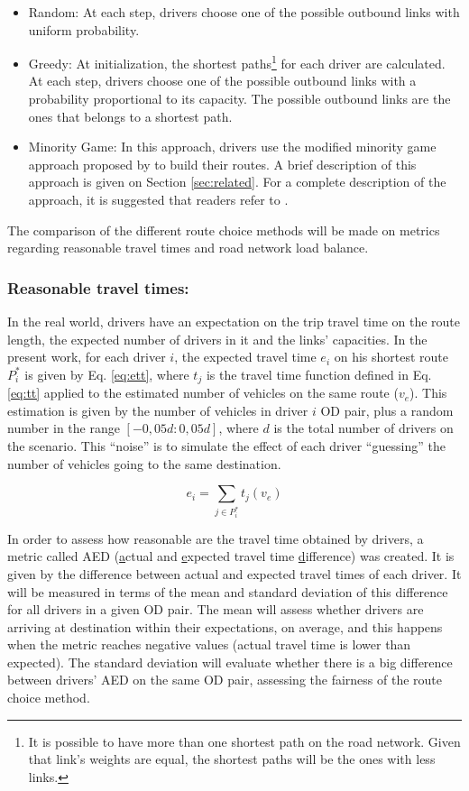 \documentclass{RITA}
\newcommand{\optRoute}[1]{\ensuremath{P_#1^*}}	%
\newcommand{\travTime}{\ensuremath{t_j}} 	%
\newcommand{\ett}[1]{\ensuremath{e_#1}}		%
\newcommand{\expVeh}{\ensuremath{v_e}}		%
\begin{document}
\begin{itemize}
  \item Random: At each step, drivers choose one of the possible outbound links with uniform probability.
  \item Greedy: At initialization, the shortest paths\footnote{It is possible to have more than one shortest path on the road network. Given that link's weights are equal, the shortest paths will be the ones with less links.} for each driver are calculated. At each step, drivers choose one of the possible outbound links with a probability proportional to its capacity. The possible outbound links are the ones that belongs to a shortest path. %
  \item Minority Game: In this approach, drivers use the modified minority game approach proposed by \cite{Galib&Moser2011} to build their routes. A brief description of this approach is given on Section \ref{sec:related}. For a complete description of the approach, it is suggested that readers refer to \cite{Galib&Moser2011}.
\end{itemize}

The comparison of the different route choice methods will be made on metrics regarding reasonable travel times and road network load balance.

\subsubsection{Reasonable travel times:}
In the real world, drivers have an expectation on the trip travel time on the route length, the expected number of drivers in it and the links' capacities. In the present work, for each driver $i$, the expected travel time $\ett{i}$ on his shortest route \optRoute{i} is given by Eq. \eqref{eq:ett}, where $\travTime$ is the travel time function defined in Eq. \eqref{eq:tt} applied to the estimated number of vehicles on the same route ($\expVeh$). This estimation is given by the number of vehicles in driver $i$ OD pair, plus a random number in the range $[-0,05d:0,05d]$, where $d$ is the total number of drivers on the scenario. This ``noise'' is to simulate the effect of each driver ``guessing'' the number of vehicles going to the same destination.

\begin{equation}
\label{eq:ett}
\ett{i} = \sum_{j \in \optRoute{i}}\travTime(\expVeh)
\end{equation}

In order to assess how reasonable are the travel time obtained by drivers, a metric called AED (\underline{a}ctual and \underline{e}xpected travel time \underline{d}ifference) was created. It is given by the difference between actual and expected travel times of each driver. It will be measured in terms of the mean and standard deviation of this difference for all drivers in a given OD pair. The mean will assess whether drivers are arriving at destination within their expectations, on average, and this happens when the metric reaches negative values (actual travel time is lower than expected). The standard deviation will evaluate whether there is a big difference between drivers' AED on the same OD pair, assessing the fairness of the route choice method.
\end{document}
